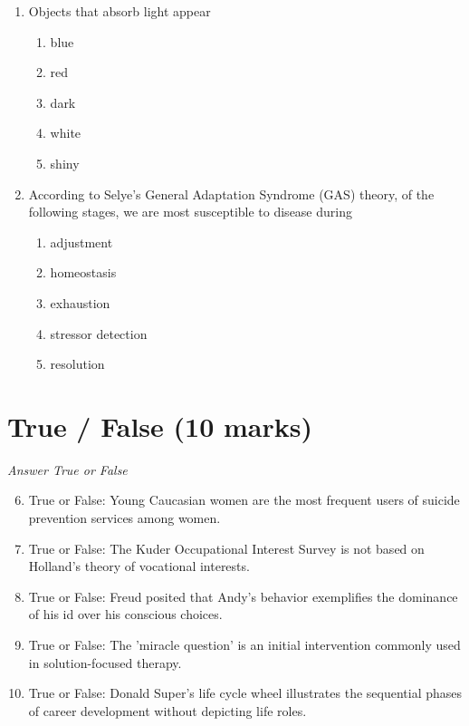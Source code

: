 \documentclass[12pt]{article}
\begin{document}
\begin{enumerate}[label=\arabic*.]
\begin{enumerate}[label=(\alph*)]
    \item Enhanced cognitive development exclusively due to nutrient composition
\end{enumerate}
\item Objects that absorb light appear
\begin{enumerate}[label=(\alph*)]
    \item blue
    \item red
    \item dark
    \item white
    \item shiny
\end{enumerate}
\item According to Selye's General Adaptation Syndrome (GAS) theory, of the following stages, we are most susceptible to disease during
\begin{enumerate}[label=(\alph*)]
    \item adjustment
    \item homeostasis
    \item exhaustion
    \item stressor detection
    \item resolution
\end{enumerate}
\end{enumerate}

\section*{True / False (10 marks)}
\textit{Answer True or False}
\begin{enumerate}[label=\arabic*.]
\setcounter{enumi}{5}
\item True or False: Young Caucasian women are the most frequent users of suicide prevention services among women.
\item True or False: The Kuder Occupational Interest Survey is not based on Holland's theory of vocational interests.
\item True or False: Freud posited that Andy's behavior exemplifies the dominance of his id over his conscious choices.
\item True or False: The 'miracle question' is an initial intervention commonly used in solution-focused therapy.
\item True or False: Donald Super's life cycle wheel illustrates the sequential phases of career development without depicting life roles.
\end{enumerate}
\end{document}

